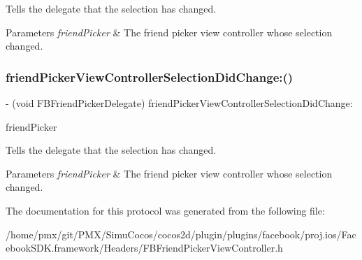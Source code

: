 Tells the delegate that the selection has changed.


\begin{DoxyParams}{Parameters}
{\em friend\+Picker} & The friend picker view controller whose selection changed. \\
\hline
\end{DoxyParams}
\mbox{\label{protocolFBFriendPickerDelegate_01-p_a6b00500fbc7158e7b0b0155b44cd02f5}} 
\subsubsection{\texorpdfstring{friend\+Picker\+View\+Controller\+Selection\+Did\+Change\+:()}{friendPickerViewControllerSelectionDidChange:()}\hspace{0.1cm}{\footnotesize\ttfamily [5/5]}}
{\footnotesize\ttfamily -\/ (void F\+B\+Friend\+Picker\+Delegate) friend\+Picker\+View\+Controller\+Selection\+Did\+Change\+: \begin{DoxyParamCaption}\item[{(\hyperlink{interfaceFBFriendPickerViewController}{F\+B\+Friend\+Picker\+View\+Controller} $\ast$)}]{friend\+Picker }\end{DoxyParamCaption}\hspace{0.3cm}{\ttfamily [optional]}}

Tells the delegate that the selection has changed.


\begin{DoxyParams}{Parameters}
{\em friend\+Picker} & The friend picker view controller whose selection changed. \\
\hline
\end{DoxyParams}


The documentation for this protocol was generated from the following file\+:\begin{DoxyCompactItemize}
\item 
/home/pmx/git/\+P\+M\+X/\+Simu\+Cocos/cocos2d/plugin/plugins/facebook/proj.\+ios/\+Facebook\+S\+D\+K.\+framework/\+Headers/F\+B\+Friend\+Picker\+View\+Controller.\+h\end{DoxyCompactItemize}
